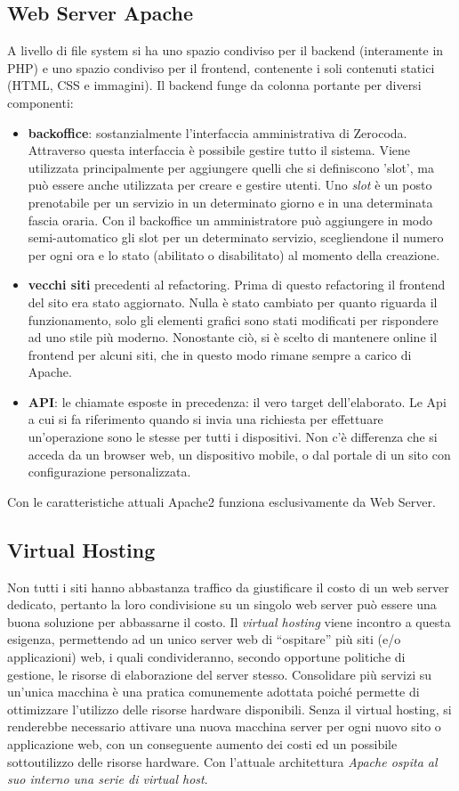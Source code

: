 \subsection{Web Server Apache}
A livello di file system si ha uno spazio condiviso per il backend (interamente in PHP) e uno spazio condiviso per il frontend, contenente i soli contenuti statici (HTML, CSS e immagini). Il backend funge da colonna portante per diversi componenti:
\begin{itemize}
    \item \textbf{backoffice}: sostanzialmente l'interfaccia amministrativa di Zerocoda. Attraverso questa interfaccia è possibile gestire tutto il sistema. Viene utilizzata principalmente per aggiungere quelli che si definiscono 'slot', ma può essere anche utilizzata per creare e gestire utenti. Uno \emph{slot} è un posto prenotabile per un servizio in un determinato giorno e in una determinata fascia oraria. Con il backoffice un amministratore può aggiungere in modo semi-automatico gli slot per un determinato servizio, scegliendone il numero per ogni ora e lo stato (abilitato o disabilitato) al momento della creazione.
    \item \textbf{vecchi siti } precedenti al refactoring. Prima di questo refactoring il frontend del sito era stato aggiornato. Nulla è stato cambiato per quanto riguarda il funzionamento, solo gli elementi grafici sono stati modificati per rispondere ad uno stile più moderno. Nonostante ciò, si è scelto di mantenere online il frontend per alcuni siti, che in questo modo rimane sempre a carico di Apache.
    \item \textbf{API}: le chiamate esposte in precedenza: il vero target dell'elaborato. Le Api a cui si fa riferimento quando si invia una richiesta per effettuare un'operazione sono le stesse per tutti i dispositivi. Non c'è differenza che si acceda da un browser web, un dispositivo mobile, o dal portale di un sito con configurazione personalizzata.
\end{itemize}   
Con le caratteristiche attuali Apache2 funziona esclusivamente da Web Server.

\subsection{Virtual Hosting}
Non tutti i siti hanno abbastanza traffico da giustificare il costo di un web server dedicato, pertanto la loro condivisione su un singolo web server può essere una buona soluzione per abbassarne il costo. Il \emph{virtual hosting} viene incontro a questa esigenza, permettendo ad un unico server web di “ospitare” più siti (e/o applicazioni) web, i quali condivideranno, secondo opportune politiche di gestione, le risorse di elaborazione del server stesso. Consolidare più servizi su un’unica macchina è una pratica comunemente adottata poiché permette di ottimizzare l’utilizzo delle risorse hardware disponibili. Senza il virtual hosting, si renderebbe necessario attivare una nuova macchina server per ogni nuovo sito o applicazione web, con un conseguente aumento dei costi ed un possibile sottoutilizzo delle risorse hardware. Con l'attuale architettura \textit{Apache ospita al suo interno una serie di virtual host}.

